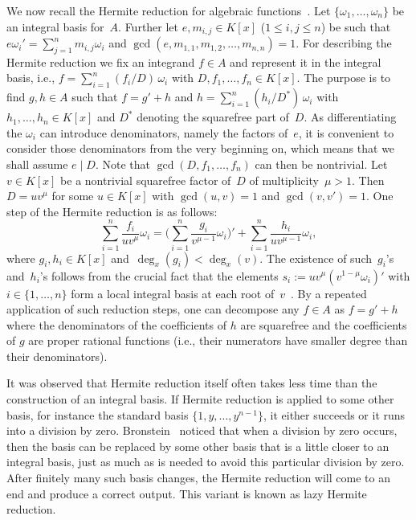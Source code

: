 \documentclass{sig-alternate-05-2015}
\begin{document}
We now recall the Hermite reduction for algebraic functions~\cite{trager84,ACA1992,bronstein98}.
Let $\{\omega_1,\ldots,\omega_n\}$ be an integral basis for~$A$.
Further let $e, m_{i,j}\in K[x]$ ($1\leq i,j\leq n$) be such that
$e\omega_i'=\sum_{j=1}^n m_{i,j}\omega_i$ and
$\gcd(e,m_{1,1},m_{1,2},\ldots,m_{n,n})=1$.
For describing the Hermite reduction we fix an integrand $f\in A$ and represent it in the
integral basis, i.e., $f=\sum_{i=1}^n (f_i/D)\,\omega_i$ with
$D, f_1,\ldots,f_n\in K[x]$. The purpose is to find $g, h\in A$ such that
$f=g' + h$ and $h=\sum_{i=1}^n(h_i/D^\ast)\,\omega_i$ with $h_1,\ldots,h_n\in K[x]$
and $D^\ast$ denoting the squarefree part of~$D$.
As differentiating the $\omega_i$ can introduce
denominators, name\-ly the factors of~$e$, it is convenient to consider those
denominators from the very beginning on, which means that we shall assume
$e\mid D$. Note that $\gcd(D,f_1,\ldots,f_n)$ can then be nontrivial.
Let~$v\in K[x]$ be a nontrivial squarefree factor of~$D$ of multiplicity~$\mu>1$.
Then~$D = uv^\mu$ for some $u\in K[x]$ with $\gcd(u, v)=1$ and $\gcd(v,v')=1$.
One step of the Hermite reduction is as follows:
\begin{equation}\label{eq:hred}
  \sum_{i=1}^n \frac{f_i}{uv^\mu}\omega_i =
  \biggl(\sum_{i=1}^n\frac{g_i}{v^{\mu-1}}\omega_i\biggr)' +
  \sum_{i=1}^n \frac{h_i}{uv^{\mu-1}}\omega_i,
\end{equation}
where $g_i, h_i \in K[x]$ and~$\deg_x(g_i)< \deg_x(v)$.
The existence of such~$g_i$'s and~$h_i$'s follows from the crucial fact that
the elements $s_i :=  uv^\mu(v^{1-\mu}\omega_i)'$ with $i\in \{ 1, \ldots, n\}$
form a local integral basis at each root of~$v$~\cite[page 46]{trager84}.
By a repeated application of such reduction steps, one can decompose any $f\in A$
as $f=g' + h$ where the denominators of the coefficients of $h$ are squarefree
and the coefficients of $g$ are proper rational functions (i.e., their numerators
have smaller degree than their denominators).

It was observed that Hermite reduction itself often takes less time than the construction
of an integral basis. If Hermite reduction is applied to some other basis, for instance
the standard basis $\{1,y,\dots,y^{n-1}\}$, it either succeeds or it runs into a division by zero.
Bronstein~\cite{bronstein98a} noticed that when a division by zero occurs, then the basis can
be replaced by some other basis that is a little closer to an integral basis, just
as much as is needed to avoid this particular division by zero. After finitely many
such basis changes, the Hermite reduction will come to an end and produce a correct
output. This variant is known as lazy Hermite reduction.
\end{document}
